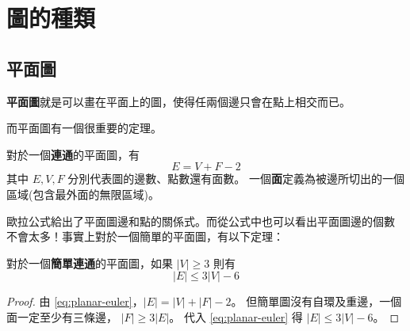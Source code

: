 \documentclass[a4paper,12pt]{book}
\begin{document}
\newcommand{\str}[1]{\texttt{"#1"}}
\newcommand{\mcstr}[2]{\texttt{"#1}\cdots\texttt{#2"}}
\newcommand{\ord}[1]{\opord\left(#1\right)}
\newcommand{\abs}[1]{\lvert #1 \rvert}
\newcommand{\floor}[1]{\lfloor #1 \rfloor}
\newcommand{\ceil}[1]{\lceil #1 \rceil}
\newcommand{\opord}{\operatorname{\mathcal{O}}}
\newcommand{\fail}{\operatorname{\mathcal{F}}}
\newcommand{\flk}{\operatorname{\mathfrak{F}}}
\newcommand{\suf}{\operatorname{\sigma}}
\newcommand{\rank}{\operatorname{\mathcal{R}}}
\newcommand{\sa}{\operatorname{\mathcal{SA}}}
\newcommand{\hei}{\operatorname{\mathcal{H}}}
\newcommand{\edps}{\operatorname{\mathcal{E}}}
\newcommand{\mx}{\operatorname{\mathcal{M}}}
\newcommand{\argmax}{\operatorname{arg\,max}}
\newcommand{\cons}[1]{\left[ \: #1 \: \right]}

\newcommand\numbereqn{\addtocounter{equation}{1}\tag{\theequation}}
\newcommand\listeqn{\hfill\refstepcounter{equation}(\theequation)}
\newenvironment{monobox}{\linespread{0.6}\Verbatim[frame=single, commandchars=\\\{\}]}{\endVerbatim}
\makeatletter


\section{圖的種類}
\subsection{平面圖}
{\bf 平面圖}就是可以畫在平面上的圖，使得任兩個邊只會在點上相交而已。

而平面圖有一個很重要的定理。
\begin{theorem}[定理 (歐拉定理)]
  對於一個{\bf 連通}的平面圖，有
  \begin{equation}
    E = V + F - 2 \label{eq:planar-euler}
  \end{equation}
  其中 $E, V, F$ 分別代表圖的邊數、點數還有面數。
  一個{\bf 面}定義為被邊所切出的一個區域(包含最外面的無限區域)。
\end{theorem}
歐拉公式給出了平面圖邊和點的關係式。而從公式中也可以看出平面圖邊的個數
不會太多！事實上對於一個簡單的平面圖，有以下定理：
\begin{theorem}[定理]
  對於一個{\bf 簡單連通}的平面圖，如果 $\abs{V} \geq 3$ 則有
  \begin{equation}
    \abs{E} \leq 3\abs{V} - 6 \label{eq:planar-2}
  \end{equation}
\end{theorem}
\begin{proof}
  由 \eqref{eq:planar-euler}，$\abs{E} = \abs{V} + \abs{F} - 2$。
  但簡單圖沒有自環及重邊，一個面一定至少有三條邊， $\abs{F} \geq 3 \abs{E}$。
  代入 \eqref{eq:planar-euler} 得 $\abs{E} \leq 3 \abs{V} - 6$。
\end{proof}
\end{document}
